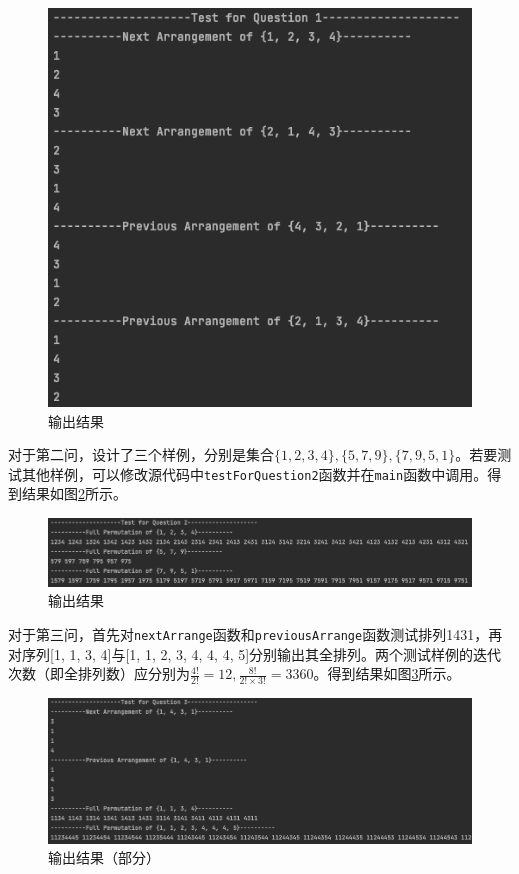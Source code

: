 \documentclass[11pt]{homework}
\begin{document}
  \begin{figure}
    \centering
    \includegraphics[width=\textwidth]{q1_output}
    \caption{输出结果}
    \label{q1_output}
  \end{figure}

  对于第二问，设计了三个样例，分别是集合$\{1, 2, 3, 4\}, \{5, 7, 9\}, \{7, 9, 5, 1\}$。若要测试其他样例，可以修改源代码中\verb|testForQuestion2|函数并在\verb|main|函数中调用。得到结果如图\ref{q2_output}所示。

  \begin{figure}
    \centering
    \includegraphics[width=\textwidth]{q2_output}
    \caption{输出结果}
    \label{q2_output}
  \end{figure}

  对于第三问，首先对\verb|nextArrange|函数和\verb|previousArrange|函数测试排列1431，再对序列[1, 1, 3, 4]与[1, 1, 2, 3, 4, 4, 4, 5]分别输出其全排列。两个测试样例的迭代次数（即全排列数）应分别为$\frac{4!}{2!} = 12, \frac{8!}{2!\times 3!} = 3360$。得到结果如图\ref{q3_output}所示。

  \begin{figure}
    \centering
    \includegraphics[width=\textwidth]{q3_output}
    \caption{输出结果（部分）}
    \label{q3_output}
  \end{figure}
\end{document}

